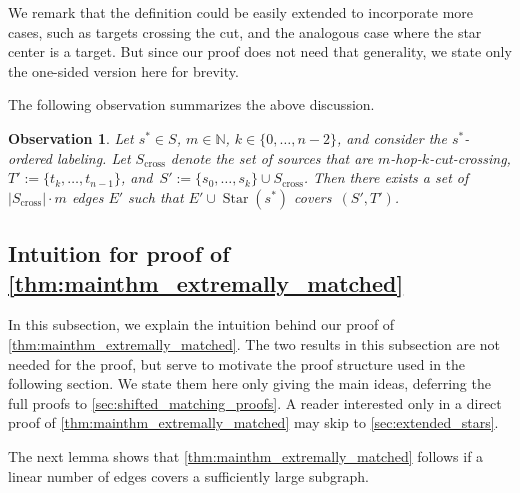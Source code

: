 \documentclass[11pt, letterpaper]{article}
\newcommand{\N}{\mathbb{N}}
\renewcommand{\star}{\operatorname{Star}}
\theoremstyle{definition}
\theoremstyle{plain}
\newtheorem{observation}[definition]{Observation}
\begin{document}
We remark that the definition could be easily extended to incorporate more cases, such as targets crossing the cut, and the analogous case where the star center is a target. 
But since our proof does not need that generality, we state only the one-sided version here for brevity.

The following observation summarizes the above discussion.

\begin{observation}
\label{obs:cut_crossing}
Let $s^*\in S$, $m\in \N$, $k\in \{0,\dots, n-2\}$, and consider the $s^*$-ordered labeling.
Let $S_\mathrm{cross}$ denote the set of sources that are  $m$-hop-$k$-cut-crossing, $T':=\{t_{k}, \dots, t_{n-1}\}$, and~$S':=\{s_0, \ldots, s_k\}\cup S_\mathrm{cross}$.
Then there exists a set of $|S_\mathrm{cross}|\cdot m$ edges $E'$ such that $E'\cup \star(s^*)$ covers~$(S',T')$.
\end{observation}



\subsection{Intuition for proof of {\cref{thm:mainthm_extremally_matched}}}
\label{sec:intuition}

In this subsection, we explain the intuition behind our proof of \cref{thm:mainthm_extremally_matched}.
The two results in this subsection are not needed for the proof, but serve to motivate the proof structure used in the following section.
We state them here only giving the main ideas, deferring the full proofs to \cref{sec:shifted_matching_proofs}.
A reader interested only in a direct proof of \cref{thm:mainthm_extremally_matched} may skip to \cref{sec:extended_stars}.

The next lemma shows that \cref{thm:mainthm_extremally_matched} follows if a linear number of edges covers a sufficiently large subgraph.
\end{document}
